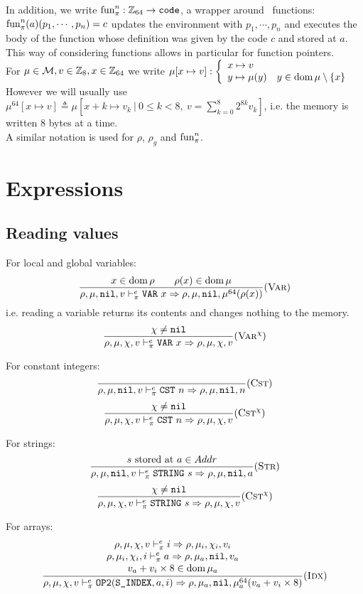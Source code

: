In addition, we write \(\text{fun}_\pi^n: \mathbb{Z}_{64}\to \texttt{code}\), a wrapper around \Cmp\ functions: \(\text{fun}_\pi^n(a)(p_1, \cdots, p_n) = c\) updates the environment with \(p_1, \cdots, p_n\) and executes the body of the function whose definition was given by the code \(c\) and stored at \(a\). This way of considering functions allows in particular for function pointers.\\

For \(\mu\in\mathcal{M}, v\in\mathbb{Z}_{8}, x\in\mathbb{Z}_{64}\) we write \(\mu[x\mapsto v]: \left\{\begin{array}{ll}x\mapsto v & \\ y\mapsto \mu(y) & y\in \operatorname{dom}\mu\setminus\{x\}\end{array}\right.\)\\
However we will usually use \(\mu^{64}[x\mapsto v] \triangleq\mu[x+k\mapsto v_k\ |\  0\leq k<8,\ v = \sum_{k=0}^8 2^{8k}v_k]\), i.e. the memory is written 8 bytes at a time.\\

A similar notation is used for \(\rho\), \(\rho_g\) and \(\text{fun}_\pi^n\).

\section{Expressions}
\subsection{Reading values}
For local and global variables:
\[\dfrac{x\in\operatorname{dom}\rho \qquad \rho(x)\in\operatorname{dom}\mu}{\rho,\mu,\texttt{nil},v \vdash_\pi^e \texttt{VAR}\ x\Rightarrow \rho,\mu,\texttt{nil},\mu^{64}(\rho(x))}(\textsc{Var})\]
i.e. reading a variable returns its contents and changes nothing to the memory.\\
\[\dfrac{\chi\ne\texttt{nil}}{\rho,\mu,\chi,v \vdash_\pi^e \texttt{VAR}\ x\Rightarrow \rho,\mu,\chi,v} (\textsc{Var}^\chi)\]

For constant integers:
\[\dfrac{}{\rho,\mu,\texttt{nil},v \vdash_\pi^e \texttt{CST}\ n\Rightarrow \rho,\mu,\texttt{nil},n}(\textsc{Cst})\]
\[\dfrac{\chi\ne\texttt{nil}}{\rho,\mu,\chi,v \vdash_\pi^e \texttt{CST}\ n\Rightarrow \rho,\mu,\chi,v} (\textsc{Cst}^\chi)\]

For strings:
\[\dfrac{s\text{ stored at }a\in Addr}{\rho,\mu,\texttt{nil},v \vdash_\pi^e \texttt{STRING}\ s\Rightarrow \rho,\mu,\texttt{nil},a}(\textsc{Str})\]
\[\dfrac{\chi\ne\texttt{nil}}{\rho,\mu,\chi,v \vdash_\pi^e \texttt{STRING}\ s\Rightarrow \rho,\mu,\chi,v} (\textsc{Cst}^\chi)\]

For arrays:
\[\dfrac{\begin{array}{c}
    \rho,\mu,\chi,v \vdash_\pi^e i\Rightarrow \rho,\mu_i,\chi_i,v_i \\
    \rho,\mu_i,\chi_i,i \vdash_\pi^e a\Rightarrow \rho,\mu_a,\texttt{nil},v_a \\
    v_a+v_i\times 8\in\operatorname{dom}\mu_a
\end{array}}{\rho,\mu,\chi,v \vdash_\pi^e \texttt{OP2}(\texttt{S\_INDEX}, a, i) \Rightarrow \rho,\mu_a,\texttt{nil},\mu_a^{64}(v_a+v_i\times 8)}(\textsc{Idx})\]

